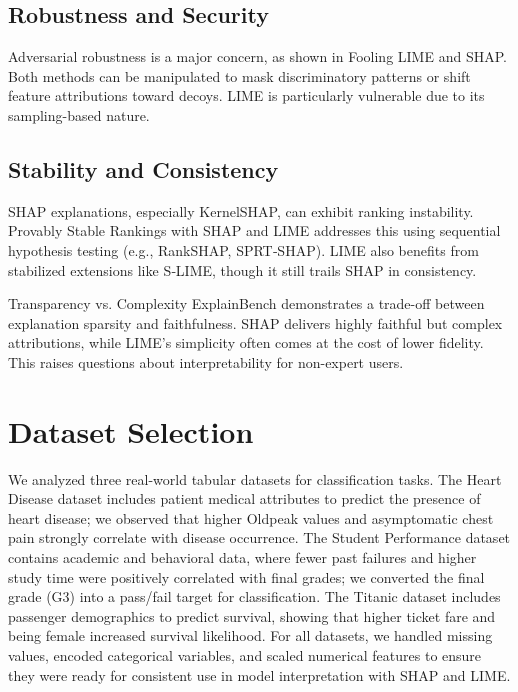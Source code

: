 \documentclass{article}
\begin{document}
\subsection{Robustness and Security}
Adversarial robustness is a major concern, as shown in Fooling LIME and SHAP. Both methods can be manipulated to mask discriminatory patterns or shift feature attributions toward decoys. LIME is particularly vulnerable due to its sampling-based nature.

\subsection{Stability and Consistency}
SHAP explanations, especially KernelSHAP, can exhibit ranking instability. Provably Stable Rankings with SHAP and LIME addresses this using sequential hypothesis testing (e.g., RankSHAP, SPRT‑SHAP). LIME also benefits from stabilized extensions like S‑LIME, though it still trails SHAP in consistency.

Transparency vs. Complexity
ExplainBench demonstrates a trade-off between explanation sparsity and faithfulness. SHAP delivers highly faithful but complex attributions, while LIME’s simplicity often comes at the cost of lower fidelity. This raises questions about interpretability for non-expert users.

\section{Dataset Selection}
We analyzed three real-world tabular datasets for classification tasks. The Heart Disease dataset includes patient medical attributes to predict the presence of heart disease; we observed that higher Oldpeak values and asymptomatic chest pain strongly correlate with disease occurrence. The Student Performance dataset contains academic and behavioral data, where fewer past failures and higher study time were positively correlated with final grades; we converted the final grade (G3) into a pass/fail target for classification. The Titanic dataset includes passenger demographics to predict survival, showing that higher ticket fare and being female increased survival likelihood. For all datasets, we handled missing values, encoded categorical variables, and scaled numerical features to ensure they were ready for consistent use in model interpretation with SHAP and LIME.
\end{document}
